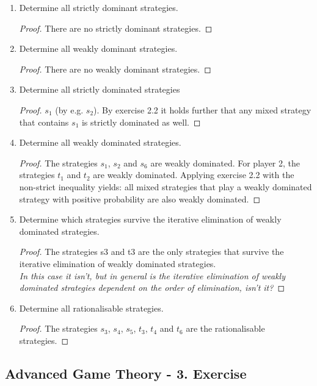 \documentclass[12pt]{extreport} %
\theoremstyle{named}
\theoremstyle{itshape}
\theoremstyle{normal}
\begin{document}
\begin{enumerate}
	\item Determine all strictly dominant strategies.
		\begin{proof}
			There are no strictly dominant strategies.
		\end{proof}
	\item Determine all weakly dominant strategies.
		\begin{proof}
		There are no weakly dominant strategies.
		\end{proof}
	\item Determine all strictly dominated strategies
		\begin{proof}
			$s_1$ (by e.g. $s_2$). By exercise 2.2 it holds further that any mixed strategy that contains $s_1$ is strictly dominated as well.
		\end{proof}
	\item Determine all weakly dominated strategies.
		\begin{proof}
			The strategies $s_1$, $s_2$ and $s_6$ are weakly dominated. For player 2, the strategies $t_1$ and $t_2$ are weakly dominated. Applying exercise 2.2 with the non-strict inequality yields: all mixed strategies that play a weakly dominated strategy with positive probability are also weakly dominated.
		\end{proof}
	\item Determine which strategies survive the iterative elimination of weakly dominated strategies.
		\begin{proof}
			The strategies s3 and t3 are the only strategies that survive the iterative elimination of weakly dominated strategies. ~\\
			
			\textit{In this case it isn't, but in general is the iterative elimination of weakly dominated strategies dependent on the order of elimination, isn't it?}
		\end{proof}
	 \item Determine all rationalisable strategies.
	 	\begin{proof}
	 		The strategies $s_3$, $s_4$, $s_5$, $t_3$, $t_4$ and $t_6$ are the rationalisable strategies.
	 	\end{proof}
\end{enumerate}


\subsection*{Advanced Game Theory - 3. Exercise}
\end{document}
